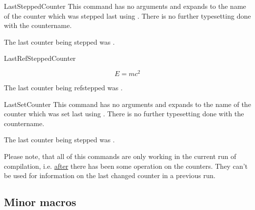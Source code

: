 \documentclass[12pt,paper=a4]{ltxdoc}
\begin{document}
\begin{docCommand}{LastSteppedCounter}{}
This command has no arguments and expands to the name of the counter which was stepped last using . There is no further typesetting done with the countername. 

\begin{dispExample}

  The last counter being stepped  was \PrettyPrintCounterName{\LastSteppedCounter}.
\end{dispExample}%

\end{docCommand}%

\begin{docCommand}{LastRefSteppedCounter}{}

\begin{dispExample}
  \begin{equation}
    E = mc^2 \label{eq::einstein}
  \end{equation}

  The last counter being refstepped  was \PrettyPrintCounterName{\LastRefSteppedCounter}.
\end{dispExample}%

\end{docCommand}%





\begin{docCommand}{LastSetCounter}{}
This command has no arguments and expands to the name of the counter which was set last using . There is no further typesetting done with the countername. 

\begin{dispExample}
  \setcounter{SomeCounter}{21}%

  The last counter being stepped  was \PrettyPrintCounterName{\LastSetCounter}.
\end{dispExample}%

\end{docCommand}%

Please note, that all of this commands are only working in the current run of compilation, i.e. \underline{after} there has been some operation on the counters. They can't be used for information on the last changed counter in a previous run. 

\subsection{Minor macros}
\end{document}
